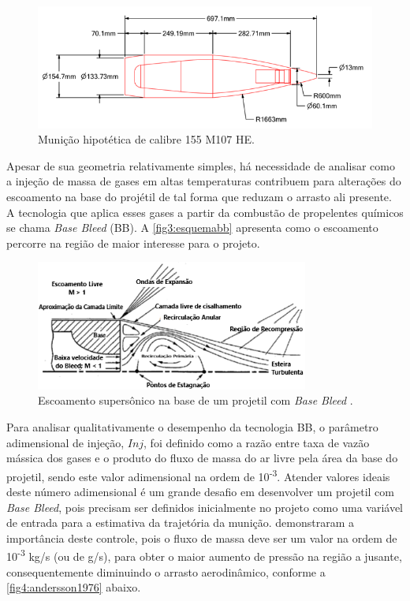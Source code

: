 \begin{figure}[!ht]
	\centering
	\includegraphics[width=1.0\textwidth]{foto02-cad-155mm.png}
	\caption[Munição hipotética de calibre \qty{155}{\millimetre} M107 HE.]{Munição hipotética de calibre \qty{155}{\millimetre} M107 HE.}
	\label{fig2:cad-155mm}
\end{figure}

Apesar de sua geometria relativamente simples, há necessidade de analisar como a injeção de massa de gases em altas temperaturas contribuem para alterações do escoamento na base do projétil de tal forma que reduzam o arrasto ali presente. A tecnologia que aplica esses gases a partir da combustão de propelentes químicos se chama \textit{Base Bleed} (BB). A \autoref{fig3:esquemabb} apresenta como o escoamento percorre na região de maior interesse para o projeto.

\begin{figure}[!ht]
	\centering
	\includegraphics[width=0.8\textwidth]{foto03-esquema-bb.png}
	\caption[Escoamento supersônico na base de um projetil com \textit{Base Bleed}.]{Escoamento supersônico na base de um projetil com \textit{Base Bleed} \cite{Mathur&Dutton1996}.}
	\label{fig3:esquemabb}
\end{figure}

Para analisar qualitativamente o desempenho da tecnologia BB, o parâmetro adimensional de injeção, \(Inj\), foi definido como a razão entre taxa de vazão mássica dos gases e o produto do fluxo de massa do ar livre pela área da base do projetil, sendo este valor adimensional na ordem de 10\textsuperscript{-3}. Atender valores ideais deste número adimensional é um grande desafio em desenvolver um projetil com \textit{Base Bleed}, pois precisam ser definidos inicialmente no projeto como uma variável de entrada para a estimativa da trajetória da munição. \cite{Andersson1976} demonstraram a importância deste controle, pois o fluxo de massa deve ser um valor na ordem de 10\textsuperscript{-3} kg/s (ou de g/s), para obter o maior aumento de pressão na região a jusante, consequentemente diminuindo o arrasto aerodinâmico, conforme a \autoref{fig4:andersson1976} abaixo.

